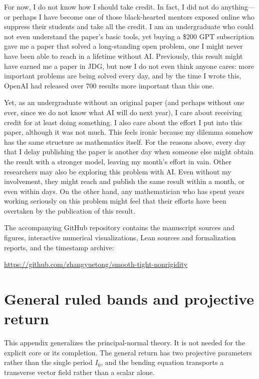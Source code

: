 \documentclass[11pt]{amsart}
\theoremstyle{definition}
\theoremstyle{remark}
\numberwithin{equation}{section}
\begin{document}
For now, I do not know how I should take credit. In fact, I did not
do anything---or perhaps I have become one of those black-hearted
mentors exposed online who suppress their students and take all the
credit. I am an undergraduate who could not even understand the paper's
basic tools, yet buying a \$200 GPT subscription gave me a paper that
solved a long-standing open problem, one I might never have been able
to reach in a lifetime without AI. Previously, this result might have
earned me a paper in JDG, but now I do not even think anyone cares:
more important problems are being solved every day, and by the time
I wrote this, OpenAI had released over 700 results more important than
this one.

Yet, as an undergraduate without an original paper (and perhaps without
one ever, since we do not know what AI will do next year), I care about
receiving credit for at least doing something. I also care about the
effort I put into this paper, although it was not much. This feels
ironic because my dilemma somehow has the same structure as mathematics
itself. For the reasons above, every day that I delay publishing the
paper is another day when someone else might obtain the result with
a stronger model, leaving my month's effort in vain. Other researchers may also be exploring this problem with AI. Even
without my involvement, they might reach and publish the same result
within a month, or even within days. On the other hand, any mathematician
who has spent years working seriously on this problem might feel that
their efforts have been overtaken by the publication of this result.

The accompanying GitHub repository contains the manuscript sources and
figures, interactive numerical visualizations, Lean sources and
formalization reports, and the timestamp archive:

\noindent\url{https://github.com/zhangyuetong/smooth-tight-nonrigidity}

\appendix
\section{General ruled bands and projective return}\label{sec:general-ruled}
This appendix generalizes the principal-normal theory. It is not needed
for the explicit core or its completion. The general return has two
projective parameters rather than the single period $I_0$, and the bending
equation transports a transverse vector field rather than a scalar alone.
\end{document}
